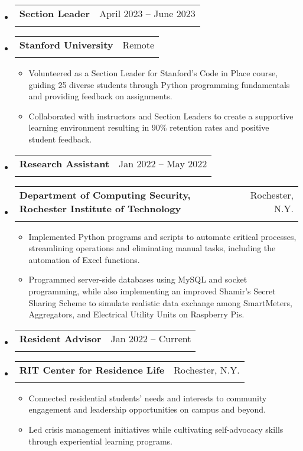 \documentclass{article}
\makeatletter
\newcommand{\resumeItem}[1]{
  \item\small{
    {#1 \vspace{-2pt}}
  }
}
\newcommand{\resumeSubheading}[4]{
  \vspace{-2pt}\item
    \begin{tabular*}{0.97\textwidth}[t]{l@{\extracolsep{\fill}}r}
      \textbf{#1} & #2 \\
      \textit{\small#3} & \textit{\small #4} \\
    \end{tabular*}\vspace{-7pt}
}
\newcommand{\resumeSubHeadingListStart}{\begin{itemize}[leftmargin=0.15in, label={}]}
\newcommand{\resumeSubHeadingListEnd}{\end{itemize}}
\newcommand{\resumeItemListStart}{\begin{itemize}}
\newcommand{\resumeItemListEnd}{\end{itemize}\vspace{-5pt}}
\makeatother
\begin{document}
\resumeSubHeadingListStart
\resumeSubheading
{Section Leader}{April 2023 -- June 2023}
{\vspace{-20pt}}{\vspace{-20pt}}
\vspace{-10pt}
\resumeSubheading
{Stanford University}{Remote}
{}{}
\resumeItemListStart
\vspace{-10pt}
\resumeItem{Volunteered as a Section Leader for Stanford's Code in Place course, guiding 25 diverse students through Python programming fundamentals and providing feedback on assignments.}
\resumeItem{Collaborated with instructors and Section Leaders to create a supportive learning environment resulting in 90\% retention rates and positive student feedback.}
\resumeItemListEnd
\resumeSubHeadingListEnd

\resumeSubHeadingListStart
\resumeSubheading
{Research Assistant}{Jan 2022 -- May 2022}
{\vspace{-20pt}}{\vspace{-20pt}}
\vspace{-10pt}
\resumeSubheading
{Department of Computing Security, Rochester Institute of Technology}{Rochester, N.Y.}
{}{}
\resumeItemListStart
\vspace{-10pt}
\resumeItem{Implemented Python programs and scripts to automate critical processes, streamlining operations and eliminating manual tasks, including the automation of Excel functions.}
\resumeItem{Programmed server-side databases using MySQL and socket programming, while also implementing an improved Shamir's Secret Sharing Scheme to simulate realistic data exchange among SmartMeters, Aggregators, and Electrical Utility Units on Raspberry Pis.}
\resumeItemListEnd
\resumeSubHeadingListEnd



\resumeSubHeadingListStart
\resumeSubheading
{Resident Advisor}{Jan 2022 -- Current}
{\vspace{-20pt}}{\vspace{-20pt}}
\vspace{-10pt}
\resumeSubheading
{RIT Center for Residence Life}{Rochester, N.Y.}
{}{}
\resumeItemListStart
\vspace{-10pt}
\resumeItem{Connected residential students’ needs and interests to community engagement and leadership opportunities on campus and beyond.}
\resumeItem{Led crisis management initiatives while cultivating self-advocacy skills through experiential learning programs.}
\resumeItemListEnd
\resumeSubHeadingListEnd
\end{document}
